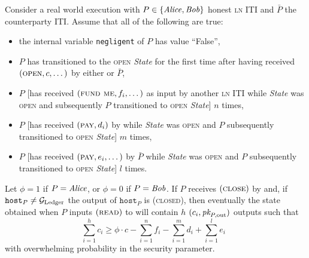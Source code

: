 \begin{lemma}
\label{lemma:real-balance-security}
  Consider a real world execution with $P \in \{\mathit{Alice}, \mathit{Bob}\}$ honest
  \textsc{ln} ITI and $\bar{P}$ the counterparty ITI. Assume that all of the
  following are true:
  \begin{itemize}
    \item the internal variable \texttt{negligent} of $P$ has value ``False'',
    \item $P$ has transitioned to the \textsc{open} \textit{State} for the first
    time after having received $(\textsc{open}, c, \dots)$ by either
    \environment or $\bar{P}$,
    \item $P$ [has received $(\textsc{fund me}, f_i, \dots)$ as input by another
    \textsc{ln} ITI while \textit{State} was \textsc{open} and subsequently $P$
    transitioned to \textsc{open} \textit{State}] $n$ times,
    \item $P$ [has received $(\textsc{pay}, d_i)$ by \environment while
    \textit{State} was \textsc{open} and $P$ subsequently transitioned to
    \textsc{open} \textit{State}] $m$ times,
    \item $P$ [has received $(\textsc{pay}, e_i, \dots)$ by $\bar{P}$ while
    \textit{State} was \textsc{open} and $P$ subsequently transitioned to
    \textsc{open} \textit{State}] $l$ times.
  \end{itemize}
  Let $\phi = 1$ if $P = \mathit{Alice}$, or $\phi = 0$ if $P = \mathit{Bob}$. If $P$ receives
  $(\textsc{close})$ by \environment and, if $\texttt{host}_P \neq \mathcal{G}_{\mathrm{Ledger}}$
  the output of $\texttt{host}_P$ is (\textsc{closed}), then eventually the
  state obtained when $P$ inputs $(\textsc{read})$ to \ledger will contain $h$
  $(c_i, \textit{pk}_{P, \mathrm{out}})$ outputs such that
  \begin{equation}
    \sum\limits_{i=1}^h c_i \geq \phi \cdot c - \sum\limits_{i=1}^n f_i -
    \sum\limits_{i=1}^m d_i + \sum\limits_{i=1}^l e_i \enspace
  \end{equation}
  with overwhelming probability in the security parameter.
\end{lemma}


